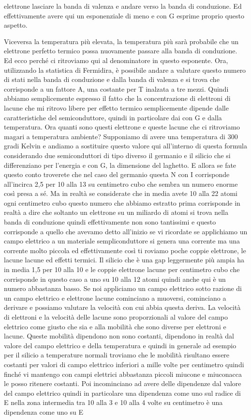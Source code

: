 elettrone lasciare la banda di valenza e andare verso la banda di conduzione. Ed effettivamente avere qui un esponenziale di meno e con G esprime proprio questo aspetto.

Viceversa la temperatura più elevata, la temperatura più sarà probabile che un elettrone perfetto termico possa nuovamente passare alla banda di conduzione. Ed ecco perché ci ritroviamo qui al denominatore in questo esponente. Ora, utilizzando la statistica di Fermidira, è possibile andare a valutare questo numero di stati nella banda di conduzione e dalla banda di valenza e si trova che corrisponde a un fattore A, una costante per T inalzata a tre mezzi. Quindi abbiamo semplicemente espresso il fatto che la concentrazione di elettroni di lacune che mi ritrovo libere per effetto termico semplicemente dipende dalle caratteristiche del semiconduttore, quindi in particolare dai con G e dalla temperatura. Ora quanti sono questi elettrone e queste lacune che ci ritroviamo magari a temperatura ambiente? Supponiamo di avere una temperatura di 300 gradi Kelvin e andiamo a sostituire questo valore qui all'interno di questa formula considerando due semiconduttori di tipo diverso il germanio e il silicio che si differenziano per l'energia e con G, la dimensione del laghetto. E allora se fate questo conto troverete che nel caso del germanio questa N con I corrisponde all'incirca 2,5 per 10 alla 13 su centimetro cubo che sembra un numero enorme così presa a sé. Ma in realtà se considerate che in media avete 10 alla 22 atomi ogni centimetro cubo questo numero che abbiamo estratto prima corrisponde in realtà a dire che soltanto un elettrone su un miliardo di atomi si trova nella banda di conduzione quindi effettivamente non sono tantissimi e questo corrisponde a quello che avevamo detto all'inizio se vi ricordate se applichiamo un campo elettrico a un materiale sempliconduttore si genera una corrente ma una corrente molto piccola ed effettivamente così ti roviamo poche coppie elettrone, le lacune lacune ed effetti termici. Il silicio che è una gap leggermente più ampia ha in media 1,5 per 10 alla 10 e le coppie elettrone lacune per centimetro cubo che corrisponde in questo caso a uno su 10 alla 12 atomi quindi anche qui è un numero abbastanza basso. Se noi appliciamo un campo elettrico sotto razione di un campo elettrico e elettrone lacune cominciano a muoversi, cominciano a derivare e possiamo valutare la velocità con cui abbia questa deriva. La velocità di elettroni e la velocità delle lacune sono proporzionali al valore del campo elettrico come giusto che sia e alla mobilità che sono diverse per elettroni e lacune. Queste mobilità dipendono non sono costanti, dipendono in realtà dal valore del campo elettrico e della temperatura e quindi in generale ad esempio per il silicio a temperature normali troviamo che le mobilità risultano essere costanti per valori di campo elettrico inferiori a mille volte per centimetro quindi finché vi mantengo con campi elettrici abbastanza piccoli miucone e miuconacca le posso ritenere costanti. Poi incominciano ad avere delle dipendenze dal valore del campo elettrico quindi in particolare una dipendenza come uno sul radice di E nella zona intermedia tra 10 alla 3 e 10 alla 4 volte su centimetro è una dipendenza come uno su E 